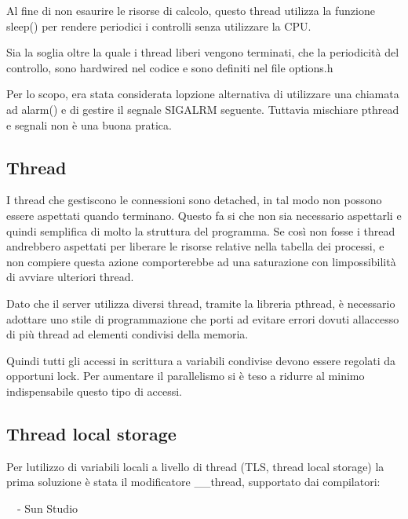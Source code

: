 \documentclass[a4paper,11pt]{article}
\begin{document}
{\sffamily
Al fine di non esaurire le risorse di calcolo, questo thread utilizza la
funzione sleep()\cite{LIBC02} per rendere periodici i controlli senza
utilizzare la CPU.}

{\sffamily
Sia la soglia oltre la quale i thread liberi vengono terminati, che la
periodicit\`a del controllo, sono hardwired nel codice e sono definiti
nel file options.h}

{\sffamily
Per lo scopo, era stata considerata l{\textquotesingle}opzione
alternativa di utilizzare una chiamata ad alarm() e di gestire il
segnale SIGALRM seguente. Tuttavia mischiare pthread e segnali non \`e
una buona pratica\cite{LIBC03}.}


\bigskip

\subsection{Thread}
{\sffamily
I thread che gestiscono le connessioni sono detached, in tal modo non
possono essere aspettati quando terminano. Questo fa si che non sia
necessario aspettarli e quindi semplifica di molto la struttura del
programma. Se cos\`i non fosse i thread andrebbero aspettati per
liberare le risorse relative nella tabella dei processi, e non compiere
questa azione comporterebbe ad una saturazione con
l{\textquotesingle}impossibilit\`a di avviare ulteriori thread.}


\bigskip

{\sffamily
Dato che il server utilizza diversi thread, tramite la libreria pthread,
\`e necessario adottare uno stile di programmazione che porti ad
evitare errori dovuti all{\textquotesingle}accesso di pi\`u thread ad
elementi condivisi della memoria.}

{\sffamily
Quindi tutti gli accessi in scrittura a variabili condivise devono
essere regolati da opportuni lock\cite{LIBC04}. Per aumentare il
parallelismo si \`e teso a ridurre al minimo indispensabile questo tipo
di accessi.}


\bigskip

\subsection{Thread local storage}
{\sffamily
Per l{\textquotesingle}utilizzo di variabili locali a livello di thread
(TLS, thread local storage) la prima soluzione \`e stata il
modificatore {\textquotedbl}\_\_thread{\textquotedbl}, supportato dai
compilatori:}

{\sffamily
\ \ {}- Sun Studio\cite{COMP01}}
\end{document}
